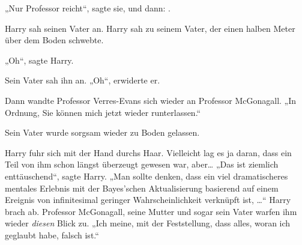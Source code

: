 „Nur Professor reicht“, sagte sie, und dann: .

Harry sah seinen Vater an.
Harry sah zu seinem Vater, der einen halben Meter über dem Boden schwebte.

„Oh“, sagte Harry.

Sein Vater sah ihn an. „Oh“, erwiderte er.

Dann wandte Professor Verres-Evans sich wieder an Professor McGonagall. „In Ordnung, Sie können mich jetzt wieder runterlassen.“

Sein Vater wurde sorgsam wieder zu Boden gelassen.

Harry fuhr sich mit der Hand durchs Haar. Vielleicht lag es ja daran, dass ein Teil von ihm schon längst überzeugt gewesen war, aber… „Das ist ziemlich enttäuschend“, sagte Harry. „Man sollte denken, dass ein viel dramatischeres mentales Erlebnis mit der Bayes’schen Aktualisierung basierend auf einem Ereignis von infinitesimal geringer Wahrscheinlichkeit verknüpft ist, …“ Harry brach ab. Professor McGonagall, seine Mutter und sogar sein Vater warfen ihm wieder \emph{diesen} Blick zu. „Ich meine, mit der Feststellung, dass alles, woran ich geglaubt habe, falsch ist.“

